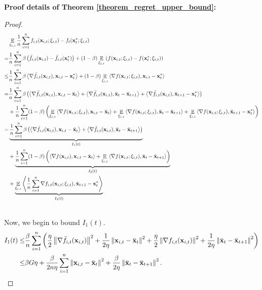\documentclass{article}
\begin{document}
\textbf{Proof details of Theorem \ref{theorem_regret_upper_bound}:}
\begin{proof}
\begin{align}
\nonumber
& \mathop{\mathbb{E}}_{\xi_{i,t}} \frac{1}{n}\sum_{i=1}^n f_{i,t}({\bf x}_{i,t};\xi_{i,t}) - f_t({\bf x}_t^\ast;\xi_{i,t}) \\ \nonumber
=& \frac{1}{n}\sum_{i=1}^n \beta \left( \bar{f}_{i,t}({\bf x}_{i,t}) - \bar{f}_{i,t}({\bf x}_t^\ast) \right) + (1-\beta) \mathop{\mathbb{E}}_{\xi_{i,t}} \left( f({\bf x}_{i,t};\xi_{i,t}) - f({\bf x}_t^\ast;\xi_{i,t}) \right) \\ \nonumber
\le & \frac{1}{n}\sum_{i=1}^n \beta \left\langle\nabla \bar{f}_{i,t}({\bf x}_{i,t}), {\bf x}_{i,t} - {\bf x}_t^\ast  \right\rangle + (1-\beta) \mathop{\mathbb{E}}_{\xi_{i,t}} \left\langle\nabla f({\bf x}_{i,t};\xi_{i,t}), {\bf x}_{i,t} - {\bf x}_t^\ast  \right\rangle \\ \nonumber
 = & \frac{1}{n}\sum_{i=1}^n \beta \left( \left\langle\nabla \bar{f}_{i,t}({\bf x}_{i,t}), {\bf x}_{i,t} - \bar{{\bf x}}_t  \right\rangle + \left\langle\nabla \bar{f}_{i,t}({\bf x}_{i,t}), \bar{{\bf x}}_t - \bar{{\bf x}}_{t+1} \right\rangle + \left\langle\nabla \bar{f}_{i,t}({\bf x}_{i,t}), \bar{{\bf x}}_{t+1} - {\bf x}_t^\ast   \right\rangle  \right) \\ \nonumber 
 & + \frac{1}{n}\sum_{i=1}^n (1-\beta) \left(  \mathop{\mathbb{E}}_{\xi_{i,t}} \left\langle\nabla f({\bf x}_{i,t};\xi_{i,t}), {\bf x}_{i,t} - \bar{{\bf x}}_t  \right\rangle +  \mathop{\mathbb{E}}_{\xi_{i,t}} \left\langle\nabla f({\bf x}_{i,t};\xi_{i,t}), \bar{{\bf x}}_t - \bar{{\bf x}}_{t+1}  \right\rangle + \mathop{\mathbb{E}}_{\xi_{i,t}} \left\langle\nabla f({\bf x}_{i,t};\xi_{i,t}), \bar{{\bf x}}_{t+1} - {\bf x}_t^\ast  \right\rangle  \right)\\ \nonumber
= & \underbrace{ \frac{1}{n}\sum_{i=1}^n \beta \left( \left\langle\nabla \bar{f}_{i,t}({\bf x}_{i,t}), {\bf x}_{i,t} - \bar{{\bf x}}_t  \right\rangle + \left\langle\nabla \bar{f}_{i,t}({\bf x}_{i,t}), \bar{{\bf x}}_t - \bar{{\bf x}}_{t+1}  \right\rangle  \right) }_{I_1(t)} \\ \nonumber 
 & + \underbrace{ \frac{1}{n}\sum_{i=1}^n (1-\beta) \left(  \left\langle\nabla f({\bf x}_{i,t}), {\bf x}_{i,t} - \bar{{\bf x}}_t  \right\rangle +  \mathop{\mathbb{E}}_{\xi_{i,t}} \left\langle\nabla f({\bf x}_{i,t};\xi_{i,t}), \bar{{\bf x}}_t - \bar{{\bf x}}_{t+1}  \right\rangle \right) }_{I_2(t)}\\ \nonumber 
&+ \underbrace{ \mathop{\mathbb{E}}_{\xi_{i,t}} \left\langle\frac{1}{n}\sum_{i=1}^n\nabla f_{i,t}({\bf x}_{i,t};\xi_{i,t}), \bar{{\bf x}}_{t+1} - {\bf x}_t^\ast  \right\rangle }_{I_3(t)}\\ \nonumber
\end{align}

Now, we begin to bound $I_1(t)$.
\begin{align}
\nonumber
I_1(t) \le & \frac{\beta}{n}\sum_{i=1}^n \left(  \frac{\eta}{2}\left\lVert\nabla \bar{f}_{i,t}({\bf x}_{i,t})\right\rVert^2 + \frac{1}{2\eta}\left\lVert{\bf x}_{i,t} - \bar{{\bf x}}_t\right\rVert^2  + \frac{\eta}{2}\left\lVert\nabla f_{i,t}({\bf x}_{i,t})\right\rVert^2 + \frac{1}{2\eta}\left\lVert\bar{{\bf x}}_t - \bar{{\bf x}}_{t+1}\right\rVert^2  \right)\\ \nonumber
\le & \beta G \eta + \frac{\beta}{2n\eta }\sum_{i=1}^n \left\lVert{\bf x}_{i,t} - \bar{{\bf x}}_t\right\rVert^2 + \frac{\beta }{2\eta }\left\lVert\bar{{\bf x}}_t - \bar{{\bf x}}_{t+1}\right\rVert^2.
\end{align}


\end{proof}
\end{document}

